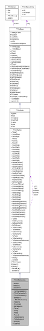 \begin{figure}[H]
\begin{center}
\leavevmode
\includegraphics[height=400pt]{class_ti_xml_declaration__coll__graph}
\end{center}
\end{figure}
